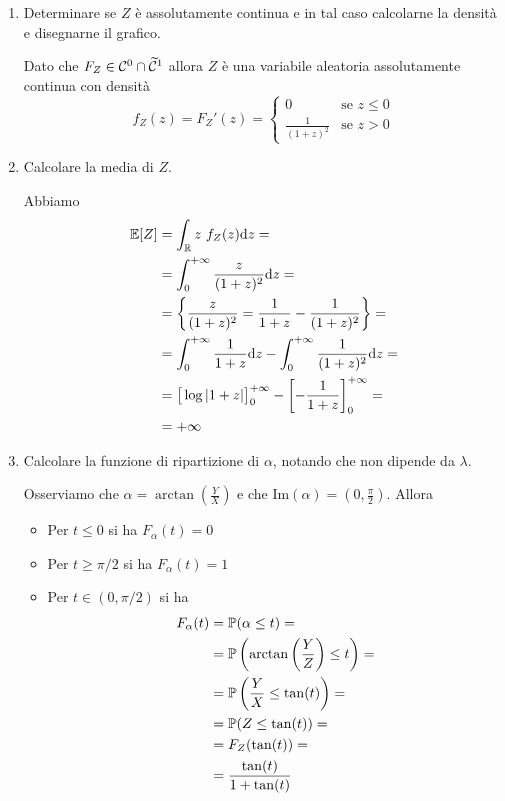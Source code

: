 \begin{enumerate}
\item Determinare se $Z$ è assolutamente continua e in tal caso calcolarne la densità e disegnarne il grafico.

Dato che $F_Z\in\mathcal{C}^0\cap\widetilde{\mathcal{C}}^1$ allora $Z$ è una variabile aleatoria assolutamente continua con densità
\[
f_Z(z)=F_Z'(z)=
\begin{cases}
0 &\text{se }z\leq 0 \\
\displaystyle\frac{1}{(1+z)^2} &\text{se }z>0
\end{cases}
\]

\item Calcolare la media di $Z$.

Abbiamo
\begin{gather*}
\begin{aligned}
\mathbb{E}[Z]&=\int_{\mathbb{R}} z\ f_Z(z)\mathrm{d} z=\\
&=\int_{0}^{+\infty}\frac{z}{(1+z)^2}\mathrm{d} z=\\
&=\left\{ \frac{z}{(1+z)^2}=\frac{1}{1+z}-\frac{1}{(1+z)^2}  \right\}=\\
&=\int_{0}^{+\infty}\frac{1}{1+z}\mathrm{d} z-\int_{0}^{+\infty}\frac{1}{(1+z)^2}\mathrm{d} z=\\
&=\big[\log |1+z|  \big]_0^{+\infty}-\left[-\frac{1}{1+z}  \right]_0^{+\infty}=\\
&=+\infty
\end{aligned}
\end{gather*}

\item Calcolare la funzione di ripartizione di $\alpha$, notando che non dipende da $\lambda$.

Osserviamo che $\displaystyle\alpha=\arctan\left(\frac{Y}{X}\right)$ e che $\displaystyle \text{Im}(\alpha)=\left(0,\frac{\pi}{2}\right)$. Allora
\begin{itemize}
\item Per $t\leq 0$ si ha $F_\alpha(t)=0$
\item Per $t\geq\pi/2$ si ha $F_\alpha(t)=1$
\item Per $t\in(0,\pi/2)$ si ha
\begin{gather*}
\begin{aligned}
F_\alpha(t)&=\mathbb{P}(\alpha\leq t)=\\
&=\mathbb{P}\left(\arctan\left(\frac{Y}{Z}\right)\leq t\right)=\\
&=\mathbb{P}\left(\frac{Y}{X}\leq\tan(t)\right)=\\
&=\mathbb{P}(Z\leq\tan(t))=\\
&=F_Z(\tan(t))=\\
&=\frac{\tan(t)}{1+\tan(t)}
\end{aligned}
\end{gather*}
\end{itemize}


\end{enumerate}
